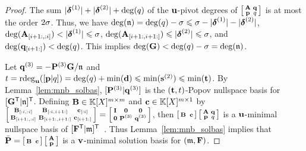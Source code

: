 \documentclass[preprint]{sig-alternate-05-2015}
\begin{document}
\begin{proof}
  \vspace{-0.1cm}
  The sum $\sumVec{\minDegs^{(1)}} + \sumVec{\minDegs^{(2)}} + \deg(q)$ of the
  $\shifts[u]$-pivot degrees of 
  $\left[ \begin{smallmatrix}
    \mat{A} & \col{q} \\
    \row{p} & q 
  \end{smallmatrix} \right]$
  is at most the order $2\degMod$.
  Thus, we have $\deg(\modulus[n]) = \deg(q) - \degMod \le \degMod -
  \sumVec{\minDegs^{(1)}} - \sumVec{\minDegs^{(2)}}$,
  $\deg(\subMat{\mat{A}}{i+1}{}{}{i}) < \sumVec{\minDegs^{(1)}} \le \degMod$,
  $\deg(\subMat{\mat{A}}{i+1}{}{i+1}{}) \le \sumVec{\minDegs^{(2)}} \le
  \degMod$, and $\deg(\subVec{\col{q}}{i+1}{}) < \deg(q)$. This implies
  $\deg(\mat{G}) < \deg(q) - \degMod = \deg(\modulus[n])$.

  Let $\col{q}^{(3)} = -\msb^{(3)} \mat{G} / \modulus[n]$ and $t =
  \rdeg[{\shifts[u]}]{[\row{p} | q]} = \deg(q) + \min(\shifts[d])
  \le \min(\shifts^{(2)}) \le \min(\shifts[t])$. By Lemma~\ref{lem:mnb_solbas},
  $[\msb^{(3)} | \col{q}^{(3)}]$ is the $(\shifts[t],t)$-Popov nullspace basis
  for $\trsp{[\trsp{\mat{G}} | \modulus[n]]}$. Defining $\mat{B} \in
  \polMatSpace[\nbun]$ and $\col{c} \in \polMatSpace[\nbun][1]$ by
  $\left[\begin{smallmatrix} \subMat{\mat{B}}{}{i}{}{i} &
      \subMat{\mat{B}}{}{i}{i+1}{} & \subVec{\col{c}}{}{i} \\
      \subMat{\mat{B}}{i+1}{}{}{i} & \subMat{\mat{B}}{i+1}{}{i+1}{} &
      \subVec{\col{c}}{i+1}{}
  \end{smallmatrix} \right] =
  \left[ \begin{smallmatrix}
    \idMat[] & \mat{0} & \mat{0} \\
    \mat{0} & \msb^{(3)} & \col{q}^{(3)}
  \end{smallmatrix} \right]$,
  then
  $\left[\begin{smallmatrix} \mat{B} \;\; \col{c} \end{smallmatrix} \right]
  \left[ \begin{smallmatrix}
    \mat{A} & \col{q} \\
    \row{p} & q 
  \end{smallmatrix} \right]$
  is a $\shifts[u]$-minimal nullspace basis of $\trsp{[\trsp{\sys} |
  \modulus]}$~\cite[Theorem~3.9]{ZhLaSt12}. Thus Lemma~\ref{lem:mnb_solbas}
  implies that
  $\bar{\msb} = \left[\begin{smallmatrix} \mat{B} \;\; \col{c} \end{smallmatrix} \right]
  \left[ \begin{smallmatrix}
    \mat{A}  \\
    \row{p}
  \end{smallmatrix} \right]$
  is a $\shifts[v]$-minimal solution basis for $(\modulus,\sys)$.


\end{proof}
\end{document}
